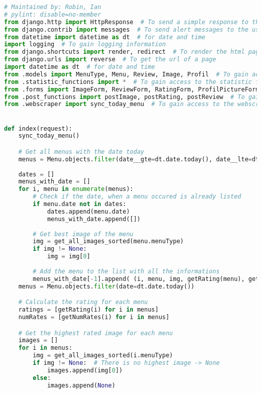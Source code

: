 \begin{lstlisting}[language=Python]
# Maintained by: Robin, Ian
# pylint: disable=no-member
from django.http import HttpResponse  # To send a simple response to the user
from django.contrib import messages  # To send alert messages to the user
from datetime import datetime as dt  # for date and time
import logging  # To gain logging information
from django.shortcuts import render, redirect  # To render the html page and redirect to another page
from django.urls import reverse  # To get the url of a page
import datetime as dt  # for date and time
from .models import MenuType, Menu, Review, Image, Profil  # To gain access to the database
from .statistic_functions import *  # To gain access to the statistic functions
from .forms import ImageForm, ReviewForm, RatingForm, ProfilPictureForm  # Create user forms
from .post_functions import postImage, postRating, postReview  # To gain access to the post functions
from .webscraper import sync_today_menu  # To gain access to the webscraper


def index(request):
    sync_today_menu()

    # Get all menus with the date today
    menus = Menu.objects.filter(date__gte=dt.date.today(), date__lte=dt.date.today() + dt.timedelta(days=7)).order_by("date")  # gte = greater than or equal
    
    dates = []
    menus_with_date = []
    for i, menu in enumerate(menus):
        # Check if the date, when a menu occured is already listed 
        if menu.date not in dates:
            dates.append(menu.date)
            menus_with_date.append([])
        
        # Get best image of the menu
        img = get_all_images_sorted(menu.menuType)
        if img != None:
            img = img[0]
        
        # Add the menu to the list with all the informations
        menus_with_date[-1].append( (i, menu, img, getRating(menu), getNumRates(menu)) )
    menus = Menu.objects.filter(date=dt.date.today())

    # Calculate the rating for each menu
    ratings = [getRating(i) for i in menus]
    numRates = [getNumRates(i) for i in menus]

    # Get the highest rated image for each menu
    images = []
    for i in menus:
        img = get_all_images_sorted(i.menuType)
        if img != None:  # There is no highest image -> None
            images.append(img[0])
        else:
            images.append(None)



\end{lstlisting}
